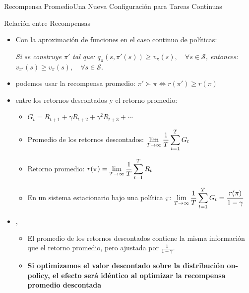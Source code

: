 \documentclass[10pt, envcountsect, handout, aspectratio=1610, hyperref={hypertexnames=true}]{beamer}
\begin{document}
\begin{frame}{Recompensa Promedio}{Una Nueva Configuración para Tareas Continuas}
\begin{itemize}
\begin{itemize}
			\end{itemize}

	\end{itemize}

\end{frame}


\begin{frame}{Relación entre Recompensas}
	
	\begin{itemize}
		\item Con la aproximación de funciones en el caso continuo  de políticas:
		
		\hfil\textit{\small Si se construye \(\pi'\) tal que:
		$
		q_\pi(s, \pi'(s)) \geq v_\pi(s), \quad \forall s \in \mathcal{S}
		$, entonces:
		$
		v_{\pi'}(s) \geq v_\pi(s), \quad \forall s \in \mathcal{S}.
		$}
		
		\item {} podemos usar la recompensa promedio:
		{\large	$\pi' \succ \pi \Leftrightarrow 	r(\pi')  \geq r (\pi) $}
			
		
		\item {} entre los retornos descontados y el retorno promedio:
			\begin{itemize}
				\item $G_t=R_{t+1}+ \gamma R_{t+2} + \gamma^2 R_{t+3} + \cdots$
				\item Promedio de los retornos descontados:
				$\displaystyle \lim_{T\rightarrow \infty} \frac{1}{T} \sum_{t=1}^T G_t$
				
				\item Retorno promedio:
				\(\displaystyle r(\pi) = \lim_{T \to \infty} \frac{1}{T} \sum_{t=1}^T R_t\)
				
				\item En un sistema estacionario bajo una política $\pi$:
				$\displaystyle \lim_{T\rightarrow \infty} \frac{1}{T} \sum_{t=1}^T G_t =\frac{r(\pi) }{1-\gamma}$
				
			\end{itemize}
			
		\item {}, 
			\begin{itemize}
				\item El promedio de los retornos descontados contiene la misma información que el retorno promedio, pero ajustada por $\frac{1}{1-\gamma}$.
				\item \textbf{Si optimizamos el valor descontado sobre la distribución on-policy, el efecto será idéntico al optimizar la recompensa promedio descontada}
			\end{itemize}
		
		
		
	
	\end{itemize}
	

	
\end{frame}
\end{document}
